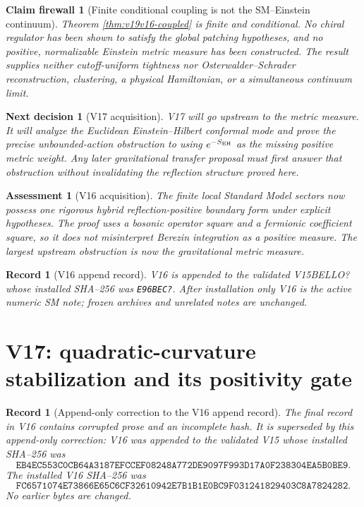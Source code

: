 \documentclass[11pt]{article}
\newtheorem{firewall}[theorem]{Claim firewall}
\newtheorem{decision}[theorem]{Next decision}
\newtheorem{assessment}[theorem]{Assessment}
\newtheorem{record}[theorem]{Record}
\theoremstyle{remark}
\begin{document}
\begin{firewall}[Finite conditional coupling is not the SM--Einstein
continuum]
\label{fire:v19v16}
Theorem \ref{thm:v19v16-coupled} is finite and conditional.  No chiral
regulator has been shown to satisfy the global patching hypotheses, and
no positive, normalizable Einstein metric measure has been constructed.
The result supplies neither cutoff-uniform tightness nor
Osterwalder--Schrader reconstruction, clustering, a physical Hamiltonian,
or a simultaneous continuum limit.
\end{firewall}

\begin{decision}[V17 acquisition]
\label{dec:v19v16-next}
V17 will go upstream to the metric measure.  It will analyze the Euclidean
Einstein--Hilbert conformal mode and prove the precise unbounded-action
obstruction to using \(e^{-S_{\rm EH}}\) as the missing positive metric
weight.  Any later gravitational transfer proposal must first answer that
obstruction without invalidating the reflection structure proved here.
\end{decision}

\begin{assessment}[V16 acquisition]
\label{ass:v19v16}
The finite local Standard Model sectors now possess one rigorous hybrid
reflection-positive boundary form under explicit hypotheses.  The proof
uses a bosonic operator square and a fermionic coefficient square, so it
does not misinterpret Berezin integration as a positive measure.  The
largest upstream obstruction is now the gravitational metric measure.
\end{assessment}

\begin{record}[V16 append record]
\label{rec:v19v16}
V16 is appended to the validated V15BELLO? whose installed SHA--256 was
\texttt{E96BEC?}.
After installation only V16 is the active numeric SM note; frozen archives
and unrelated notes are unchanged.
\end{record}



\section{V17: quadratic-curvature stabilization and its positivity gate}
\label{sec:v19v17}

\begin{record}[Append-only correction to the V16 append record]
\label{rec:v19v17-v16-correction}
The final record in V16 contains corrupted prose and an incomplete hash.
It is superseded by this append-only correction: V16 was appended to the
validated V15 whose installed SHA--256 was
\[
 \texttt{EB4EC553C0CB64A3187EFCCEF08248A772DE9097F993D17A0F238304EA5B0BE9}.
                                                               \tag{20.1}
\]
The installed V16 SHA--256 was
\[
 \texttt{FC6571074E73866E65C6CF32610942E7B1B1E0BC9F031241829403C8A7824282}.
                                                               \tag{20.2}
\]
No earlier bytes are changed.
\end{record}
\end{document}
